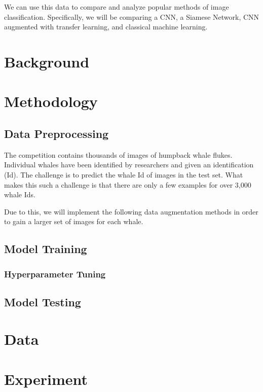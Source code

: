 \documentclass[paper=a4, fontsize=11pt]{scrartcl}
\numberwithin{equation}{section}		%
\numberwithin{table}{section}				%
\begin{document}
We can use this data to compare and analyze popular methods of image classification. Specifically, we will be comparing a CNN, a Siamese Network, CNN augmented with transfer learning, and classical machine learning.

\section{Background}\label{sec: background}

\section{Methodology}\label{sec: meth}

\subsection{Data Preprocessing}

The competition contains thousands of images of humpback whale flukes. Individual whales have been identified by researchers and given an identification (Id). The challenge is to predict the whale Id of images in the test set. What makes this such a challenge is that there are only a few examples for over 3,000 whale Ids.

Due to this, we will implement the following data augmentation methods in order to gain a larger set of images for each whale.

\subsection{Model Training}

\subsubsection{Hyperparameter Tuning}

\subsection{Model Testing}

\section{Data}\label{sec: data}

\section{Experiment}\label{sec: experiment}
\end{document}
